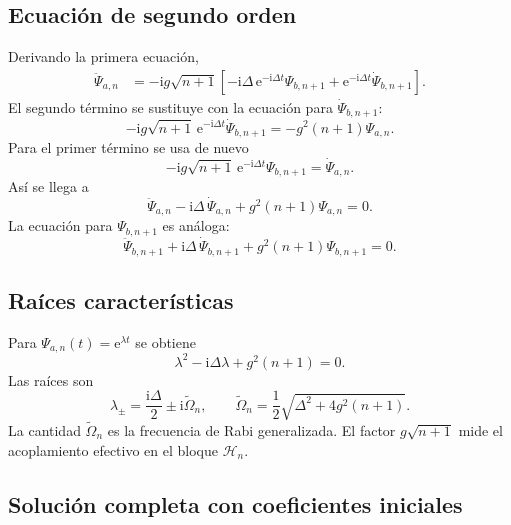 \documentclass[11pt]{article}
\newcommand{\ii}{\mathrm{i}}
\newcommand{\ee}{\mathrm{e}}
\newcommand{\Omn}{\tilde\Omega_n}
\begin{document}
\subsection{Ecuaci\'on de segundo orden}

Derivando la primera ecuaci\'on,
\begin{align}
  \ddot\Psi_{a,n}
  &=
  -\ii g\sqrt{n+1}
  \left[
  -\ii\Delta\,\ee^{-\ii\Delta t}\Psi_{b,n+1}
  +
  \ee^{-\ii\Delta t}\dot\Psi_{b,n+1}
  \right].
\end{align}
El segundo t\'ermino se sustituye con la ecuaci\'on para
$\dot\Psi_{b,n+1}$:
\begin{equation}
  -\ii g\sqrt{n+1}\,\ee^{-\ii\Delta t}\dot\Psi_{b,n+1}
  =
  -g^2(n+1)\Psi_{a,n}.
\end{equation}
Para el primer t\'ermino se usa de nuevo
\begin{equation}
  -\ii g\sqrt{n+1}\,\ee^{-\ii\Delta t}\Psi_{b,n+1}
  =
  \dot\Psi_{a,n}.
\end{equation}
As\'i se llega a
\begin{equation}
  \ddot\Psi_{a,n}
  -
  \ii\Delta\,\dot\Psi_{a,n}
  +
  g^2(n+1)\Psi_{a,n}
  =
  0.
\end{equation}
La ecuaci\'on para $\Psi_{b,n+1}$ es an\'aloga:
\begin{equation}
  \ddot\Psi_{b,n+1}
  +
  \ii\Delta\,\dot\Psi_{b,n+1}
  +
  g^2(n+1)\Psi_{b,n+1}
  =
  0.
\end{equation}

\subsection{Ra\'ices caracter\'isticas}

Para $\Psi_{a,n}(t)=\ee^{\lambda t}$ se obtiene
\begin{equation}
  \lambda^2-\ii\Delta\lambda+g^2(n+1)=0.
\end{equation}
Las ra\'ices son
\begin{equation}
  \lambda_{\pm}
  =
  \frac{\ii\Delta}{2}
  \pm
  \ii\Omn,
  \qquad
  \boxed{
  \Omn=\frac{1}{2}\sqrt{\Delta^2+4g^2(n+1)}.
  }
\end{equation}
La cantidad $\Omn$ es la frecuencia de Rabi generalizada. El factor
$g\sqrt{n+1}$ mide el acoplamiento efectivo en el bloque $\mathcal H_n$.

\subsection{Soluci\'on completa con coeficientes iniciales}
\end{document}
